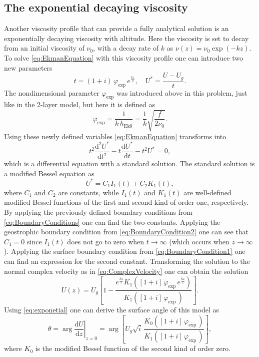 \subsection{The exponential decaying viscosity}
Another viscosity profile that can provide a fully analytical solution is an exponentially decaying viscosity with altitude. Here the viscosity is set to decay from an initial viscosity of $\nu_0$, with a decay rate of $k$ as $\nu(z)=\nu_0\exp\left(-kz\right)$. To solve \autoref{eq:EkmanEquation} with this viscosity profile one can introduce two new parameters 
\begin{equation}
    t=\left(1+i\right)\,\varphi_\text{exp}\, e^{\frac{kz}{2}}, \quad U^\ast = \frac{U-U_g}{t}. 
\end{equation}
The nondimensional parameter $\varphi_\text{exp}$ was introduced above in this problem, just like in the 2-layer model, but here it is defined as 
\begin{equation}
    \varphi_\text{exp}=\frac{1}{k\,h_\text{Ek0}}=\frac{1}{k}\sqrt{\frac{f}{2\nu_0}}.
\end{equation}
Using these newly defined variables \autoref{eq:EkmanEquation} transforms into 
\begin{equation}
    t^2\frac{\mathrm{d}^2 U^\ast}{\mathrm{d} t^2}-t\frac{\mathrm{d} U^\ast}{\mathrm{d} t}-t^2U^\ast=0,
\end{equation}
which is a differential equation with a standard solution. The standard solution is a modified Bessel equation as 
\begin{equation}
    U^\ast=C_1I_1(t)+C_2K_1(t),
\end{equation}
where $C_1$ and $C_2$ are constants, while $I_1(t)$ and $K_1(t)$ are well-defined modified Bessel functions of the first and second kind of order one, respectively. By applying the previously defined boundary conditions from \autoref{eq:BoundaryConditions} one can find the two constants. Applying the geostrophic boundary condition from \autoref{eq:BoundaryCondition2} one can see that $C_1=0$ since $I_1(t)$ does not go to zero when $t\rightarrow\infty$ (which occurs when $z\rightarrow\infty$). Applying the surface boundary condition from \autoref{eq:BoundaryCondition1} one can find an expression for the second constant. Transforming the solution to the normal complex velocity as in \autoref{eq:ComplexVelocity} one can obtain the solution
\begin{equation}
    U(z)=U_g\left[1-\frac{e^{\frac{kz}{2}}K_1\left(\left[1+i\right]\,\varphi_\text{exp}\, e^{\frac{kz}{2}}\right)}{K_1\left(\left[1+i\right]\,\varphi_\text{exp}\,\right)}\right].
    \label{eq:exponetial}
\end{equation}
Using \autoref{eq:exponetial} one can derive the surface angle of this model as 
\begin{equation}
    \theta = \arg \left.\frac{\mathrm{d} U}{\mathrm{d} z}\right|_{z=0} = \arg\left[U_g\sqrt{i}\,\frac{K_0\left(\left[1+i\right]\,\varphi_\text{exp}\,\right)}{K_1\left(\left[1+i\right]\,\varphi_\text{exp}\,\right)}\right],
    \label{eq:ExponetialAngle}
\end{equation} 
where $K_0$ is the modified Bessel function of the second kind of order zero. 


